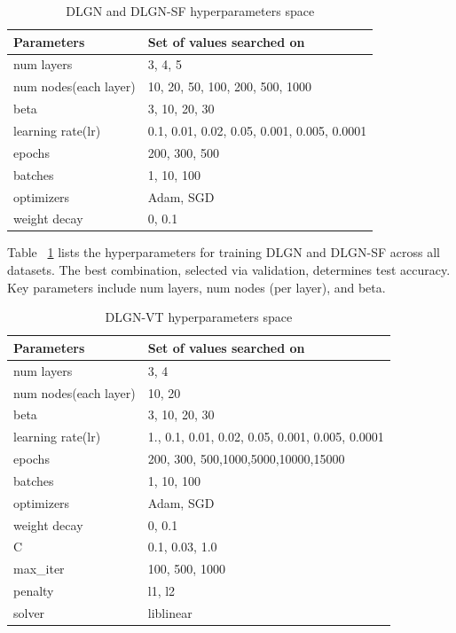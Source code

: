 \documentclass{article} %
\renewcommand{\>}{{\rightarrow}}
\renewcommand{\=}{\stackrel{\triangle}{=}}
\newcommand{\0}{{\mathbf 0}}
\begin{document}
\begin{table}[htbp]
\caption{DLGN and DLGN-SF hyperparameters space}
\label{dlgn-hyp}
\begin{center}
\begin{tabular}{|p{4cm}|p{8cm}|}
\hline
Parameters &Set of values searched on\\
 \hline
num layers     &3, 4, 5\\
num nodes(each layer)   &10, 20, 50, 100, 200, 500, 1000\\
beta  &3, 10, 20, 30\\
learning rate(lr)     &0.1, 0.01, 0.02, 0.05, 0.001, 0.005, 0.0001\\
epochs   &200, 300, 500\\
batches  &1, 10, 100\\
optimizers     &Adam, SGD\\
weight decay   &0, 0.1\\
\hline 
\end{tabular}
\end{center}
\end{table}

Table ~\ref{dlgn-hyp} lists the hyperparameters for training DLGN and DLGN-SF across all datasets. The best combination, selected via validation, determines test accuracy. Key parameters include num layers, num nodes (per layer), and beta.

\begin{table}[htbp]
\caption{DLGN-VT hyperparameters space}
\label{dlgn-vt-hyp}
\begin{center}
\begin{tabular}{|p{4cm}|p{8cm}|}
\hline
Parameters &Set of values searched on\\
 \hline
num layers     &3, 4\\
num nodes(each layer)   &10, 20\\
beta  &3, 10, 20, 30\\
learning rate(lr)     &1., 0.1, 0.01, 0.02, 0.05, 0.001, 0.005, 0.0001\\
epochs   &200, 300, 500,1000,5000,10000,15000\\
batches  &1, 10, 100\\
optimizers     &Adam, SGD\\
weight decay   &0, 0.1\\
C &0.1, 0.03, 1.0\\
max\_iter &100, 500, 1000\\
penalty &l1, l2\\
solver &liblinear\\
\hline 
\end{tabular}
\end{center}
\end{table}
\end{document}
